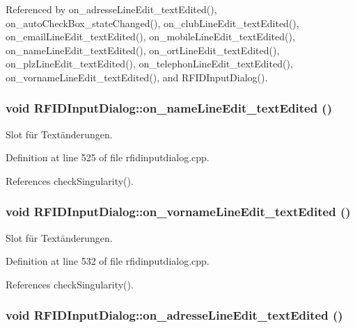 Referenced by on\_\-adresseLineEdit\_\-textEdited(), on\_\-autoCheckBox\_\-stateChanged(), on\_\-clubLineEdit\_\-textEdited(), on\_\-emailLineEdit\_\-textEdited(), on\_\-mobileLineEdit\_\-textEdited(), on\_\-nameLineEdit\_\-textEdited(), on\_\-ortLineEdit\_\-textEdited(), on\_\-plzLineEdit\_\-textEdited(), on\_\-telephonLineEdit\_\-textEdited(), on\_\-vornameLineEdit\_\-textEdited(), and RFIDInputDialog().\hypertarget{class_r_f_i_d_input_dialog_5318d27b73bdd6b480d2bd7e4393d9b3}{
\subsubsection[on\_\-nameLineEdit\_\-textEdited]{\setlength{\rightskip}{0pt plus 5cm}void RFIDInputDialog::on\_\-nameLineEdit\_\-textEdited ()}}
\label{class_r_f_i_d_input_dialog_5318d27b73bdd6b480d2bd7e4393d9b3}


Slot für Textänderungen. 



Definition at line 525 of file rfidinputdialog.cpp.

References checkSingularity().\hypertarget{class_r_f_i_d_input_dialog_dbd5b406b288c271329508dff10de89e}{
\subsubsection[on\_\-vornameLineEdit\_\-textEdited]{\setlength{\rightskip}{0pt plus 5cm}void RFIDInputDialog::on\_\-vornameLineEdit\_\-textEdited ()}}
\label{class_r_f_i_d_input_dialog_dbd5b406b288c271329508dff10de89e}


Slot für Textänderungen. 



Definition at line 532 of file rfidinputdialog.cpp.

References checkSingularity().\hypertarget{class_r_f_i_d_input_dialog_088462e0b153f91f99f4cd076cdb014d}{
\subsubsection[on\_\-adresseLineEdit\_\-textEdited]{\setlength{\rightskip}{0pt plus 5cm}void RFIDInputDialog::on\_\-adresseLineEdit\_\-textEdited ()}}
\label{class_r_f_i_d_input_dialog_088462e0b153f91f99f4cd076cdb014d}


